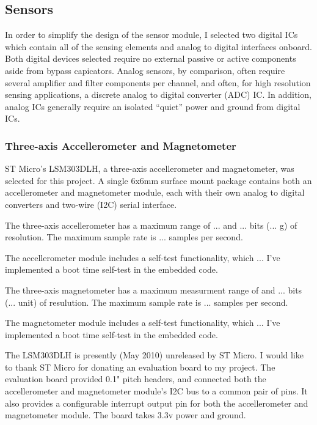 \documentclass[12pt]{report}
\begin{document}
\subsection{Sensors}
In order to simplify the design of the sensor module, I selected two digital ICs which contain all of the sensing elements and analog to digital interfaces onboard. 
Both digital devices selected require no external passive or active components aside from bypass capicators. Analog sensors, by comparison, often require several amplifier and filter components per channel, and often, for high resolution sensing applications, a discrete analog to digital converter (ADC) IC. In addition, analog ICs generally require an isolated ``quiet'' power and ground from digital ICs. 

\subsubsection{Three-axis Accellerometer and Magnetometer}
ST Micro's LSM303DLH, a three-axis accellerometer and magnetometer, was selected for this project. A single 6x6mm surface mount package contains both an accellerometer and magnetometer module, each with their own analog to digital converters and two-wire (I2C) serial interface. 

The three-axis accellerometer has a maximum range of ... and ... bits (... g) of resolution. The maximum sample rate is ... samples per second.

The accellerometer module includes a self-test functionality, which ...
I've implemented a boot time self-test in the embedded code.

The three-axis magnetometer has a maximum measurment range of  and ... bits (... unit) of resulution. The maximum sample rate is ... samples per second. 

The magnetometer module includes a self-test functionality, which ...
I've implemented a boot time self-test in the embedded code.

The LSM303DLH is presently (May 2010) unreleased by ST Micro. I would like to thank ST Micro for donating an evaluation board to my project. The evaluation board provided 0.1" pitch headers, and connected both the accellerometer and magnetometer module's I2C bus to a common pair of pins. It also provides a configurable interrupt output pin for both the accellerometer and magnetometer module. The board takes 3.3v power and ground.

\end{document}
